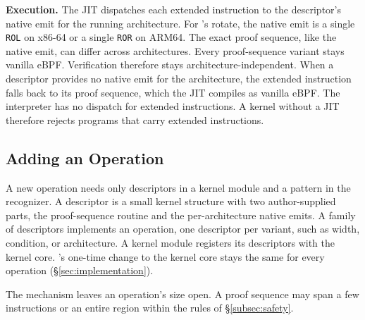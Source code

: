\noindent\textbf{Execution.}
The JIT dispatches each extended instruction to the descriptor's native emit for the running architecture.
For \lang's rotate, the native emit is a single \texttt{ROL} on x86-64 or a single \texttt{ROR} on ARM64.
The exact proof sequence, like the native emit, can differ across architectures.
Every proof-sequence variant stays vanilla eBPF.
Verification therefore stays architecture-independent.
When a descriptor provides no native emit for the architecture, the extended instruction falls back to its proof sequence, which the JIT compiles as vanilla eBPF.
The interpreter has no dispatch for extended instructions.
A kernel without a JIT therefore rejects programs that carry extended instructions.

\subsection{Adding an Operation}
\label{subsec:adding}

A new operation needs only descriptors in a kernel module and a pattern in the recognizer.
A descriptor is a small kernel structure with two author-supplied parts, the proof-sequence routine and the per-architecture native emits.
A family of descriptors implements an operation, one descriptor per variant, such as width, condition, or architecture.
A kernel module registers its descriptors with the kernel core.
\tool's one-time change to the kernel core stays the same for every operation (\S\ref{sec:implementation}).

The mechanism leaves an operation's size open.
A proof sequence may span a few instructions or an entire region within the rules of \S\ref{subsec:safety}.

